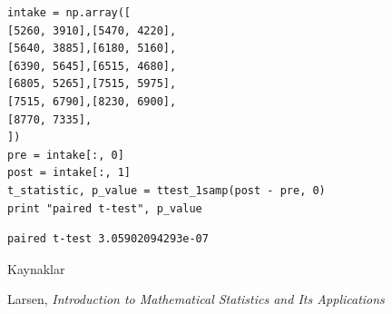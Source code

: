 \documentclass[12pt,fleqn]{article}\usepackage{../common}
\begin{document}
\begin{verbatim}
intake = np.array([
[5260, 3910],[5470, 4220],
[5640, 3885],[6180, 5160],
[6390, 5645],[6515, 4680],
[6805, 5265],[7515, 5975],
[7515, 6790],[8230, 6900],
[8770, 7335],
])
pre = intake[:, 0]
post = intake[:, 1]
t_statistic, p_value = ttest_1samp(post - pre, 0)
print "paired t-test", p_value
\end{verbatim}

\begin{verbatim}
paired t-test 3.05902094293e-07
\end{verbatim}

Kaynaklar

Larsen, {\em Introduction to Mathematical Statistics and Its Applications}
\end{document}
